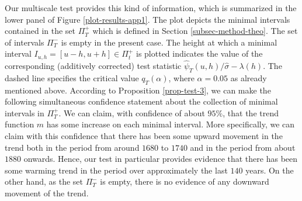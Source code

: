 Our multiscale test provides this kind of information, which is summarized in the lower panel of Figure \ref{plot-results-app1}. The plot depicts the minimal intervals contained in the set $\Pi_T^+$ which is defined in Section \ref{subsec-method-theo}. The set of intervals $\Pi_T^-$ is empty in the present case. The height at which a minimal interval $I_{u,h} = [u-h,u+h] \in \Pi_t^+$ is plotted indicates the value of the corresponding (additively corrected) test statistic $\widehat{\psi}_T(u,h) / \widehat{\sigma} - \lambda(h)$. The dashed line specifies the critical value $q_T(\alpha)$, where $\alpha = 0.05$ as already mentioned above. According to Proposition \ref{prop-test-3}, we can make the following simultaneous confidence statement about the collection of minimal intervals in $\Pi_T^+$. We can claim, with confidence of about $95\%$, that the trend function $m$ has some increase on each minimal interval. More specifically, we can claim with this confidence that there has been some upward movement in the trend both in the period from around $1680$ to $1740$ and in the period from about $1880$ onwards. Hence, our test in particular provides evidence that there has been some warming trend in the period over approximately the last $140$ years. On the other hand, as the set $\Pi_T^-$ is empty, there is no evidence of any downward movement of the trend.  

